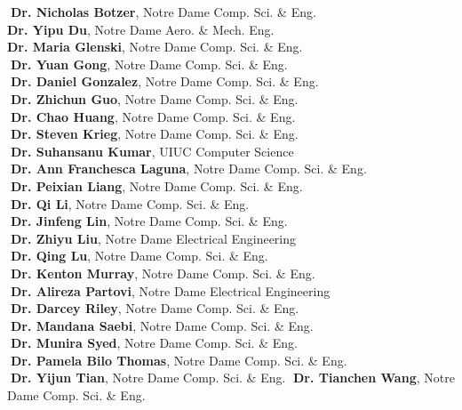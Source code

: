 \documentclass[10pt]{article}
\newenvironment{myindentpar}[1]%
{\begin{list}{}%
         {\setlength{\leftmargin}{#1}}%
         \item[]%
}
{\end{list}}
\newcounter{list}
\begin{document}
\begin{myindentpar}{0.75cm}
{\textcolor{white}{.}{\bf Dr. Nicholas Botzer}, Notre Dame Comp. Sci. \& Eng. \\
\textcolor{white}{} {\bf Dr. Yipu Du}, Notre Dame Aero. \& Mech. Eng. \\
\textcolor{white}{} {\bf Dr. Maria Glenski}, Notre Dame Comp. Sci. \& Eng. \\
\textcolor{white}{.}{\bf Dr. Yuan Gong}, Notre Dame Comp. Sci. \& Eng. \\
\textcolor{white}{.}{\bf Dr. Daniel Gonzalez}, Notre Dame Comp. Sci. \& Eng. \\
\textcolor{white}{.}{\bf Dr. Zhichun Guo}, Notre Dame Comp. Sci. \& Eng. \\
\textcolor{white}{.}{\bf Dr. Chao Huang}, Notre Dame Comp. Sci. \& Eng. \\
\textcolor{white}{.}{\bf Dr. Steven Krieg}, Notre Dame Comp. Sci. \& Eng. \\
\textcolor{white}{.}{\bf Dr. Suhansanu Kumar}, UIUC Computer Science \\
\textcolor{white}{.}{\bf Dr. Ann Franchesca Laguna}, Notre Dame Comp. Sci. \& Eng. \\
\textcolor{white}{.}{\bf Dr. Peixian Liang}, Notre Dame Comp. Sci. \& Eng. \\
\textcolor{white}{.}{\bf Dr. Qi Li}, Notre Dame Comp. Sci. \& Eng. \\
\textcolor{white}{.}{\bf Dr. Jinfeng Lin}, Notre Dame Comp. Sci. \& Eng. \\
\textcolor{white}{.}{\bf Dr. Zhiyu Liu}, Notre Dame Electrical Engineering \\
\textcolor{white}{.}{\bf Dr. Qing Lu}, Notre Dame Comp. Sci. \& Eng. \\
\textcolor{white}{.}{\bf Dr. Kenton Murray}, Notre Dame Comp. Sci. \& Eng. \\
\textcolor{white}{.}{\bf Dr. Alireza Partovi}, Notre Dame Electrical Engineering \\
\textcolor{white}{.}{\bf Dr. Darcey Riley}, Notre Dame Comp. Sci. \& Eng. \\
\textcolor{white}{.}{\bf Dr. Mandana Saebi}, Notre Dame Comp. Sci. \& Eng. \\
\textcolor{white}{.}{\bf Dr. Munira Syed}, Notre Dame Comp. Sci. \& Eng. \\
\textcolor{white}{.}{\bf Dr. Pamela Bilo Thomas}, Notre Dame Comp. Sci. \& Eng. \\
\textcolor{white}{.}{\bf Dr. Yijun Tian}, Notre Dame Comp. Sci. \& Eng.
\textcolor{white}{.}{\bf Dr. Tianchen Wang}, Notre Dame Comp. Sci. \& Eng. \\
}
\end{myindentpar}
\end{document}
